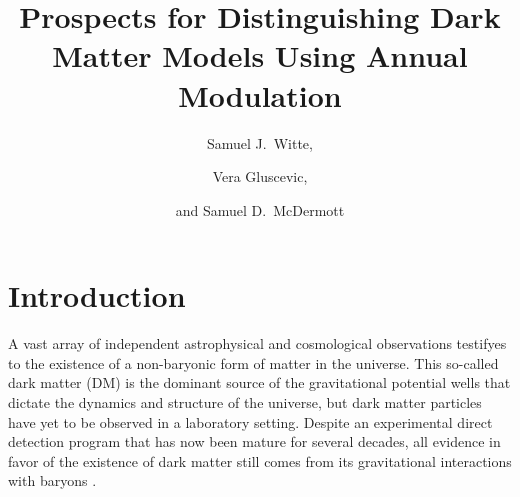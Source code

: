 \documentclass[11pt]{article}
\begin{document}
\title{Prospects for Distinguishing Dark Matter Models Using Annual Modulation}
\author[a,b]{Samuel J.~Witte,}
\author[c]{Vera Gluscevic,}
\author[d]{and Samuel D.~McDermott}






\abstract{


}

\maketitle

\section{Introduction} \setcounter{page}{2}

A vast array of independent astrophysical and cosmological observations testifyes to the existence of a non-baryonic form of matter in the universe. This so-called dark matter (DM) is the dominant source of the gravitational potential wells that dictate the dynamics and structure of the universe, but dark matter particles have yet to be observed in a laboratory setting. Despite an experimental direct detection program that has now been mature for several decades, all evidence in favor of the existence of dark matter still comes from its gravitational interactions with baryons \cite{Bauer:2013ihz}.
\end{document}
